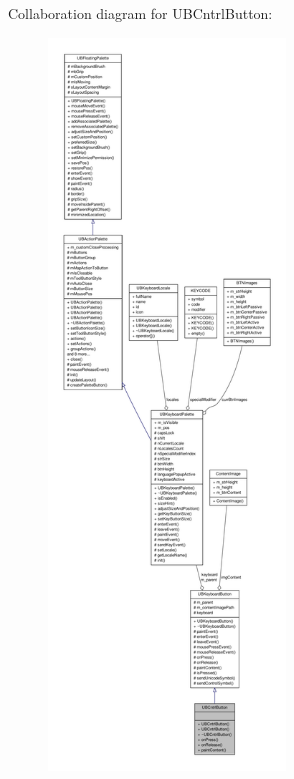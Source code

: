 Collaboration diagram for U\-B\-Cntrl\-Button\-:
\nopagebreak
\begin{figure}[H]
\begin{center}
\leavevmode
\includegraphics[height=550pt]{d4/d11/class_u_b_cntrl_button__coll__graph}
\end{center}
\end{figure}
